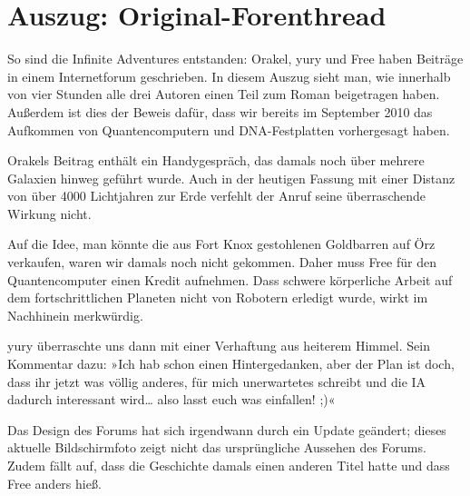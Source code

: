 \chapter{Auszug: Original-Forenthread}

So sind die Infinite Adventures entstanden: Orakel, yury und Free haben Beiträge in einem Internetforum geschrieben. In diesem Auszug sieht man, wie innerhalb von vier Stunden alle drei Autoren einen Teil zum Roman beigetragen haben. Außerdem ist dies der Beweis dafür, dass wir bereits im September 2010 das Aufkommen von Quantencomputern und DNA-Festplatten vorhergesagt haben.

Orakels Beitrag enthält ein Handygespräch, das damals noch über mehrere Galaxien hinweg geführt wurde. Auch in der heutigen Fassung mit einer Distanz von über 4000 Lichtjahren zur Erde verfehlt der Anruf seine überraschende Wirkung nicht.

Auf die Idee, man könnte die aus Fort Knox gestohlenen Goldbarren auf Örz verkaufen, waren wir damals noch nicht gekommen. Daher muss Free für den Quantencomputer einen Kredit aufnehmen. Dass schwere körperliche Arbeit auf dem fortschrittlichen Planeten nicht von Robotern erledigt wurde, wirkt im Nachhinein merkwürdig.

yury überraschte uns dann mit einer Verhaftung aus heiterem Himmel. Sein Kommentar dazu: »Ich hab schon einen Hintergedanken, aber der Plan ist doch, dass ihr jetzt was völlig anderes, für mich unerwartetes schreibt und die IA dadurch interessant wird… also lasst euch was einfallen! ;)«

Das Design des Forums hat sich irgendwann durch ein Update geändert; dieses aktuelle Bildschirmfoto zeigt nicht das ursprüngliche Aussehen des Forums. Zudem fällt auf, dass die Geschichte damals einen anderen Titel hatte und dass Free anders hieß.

